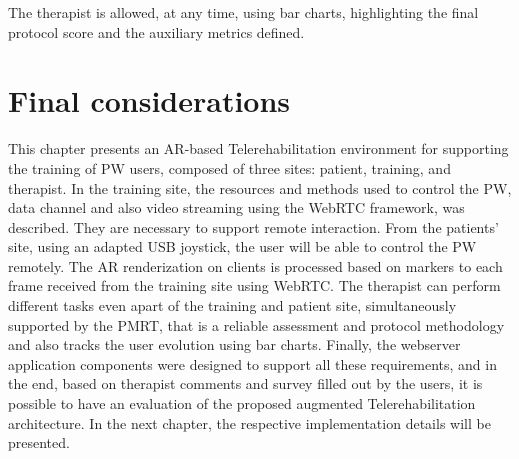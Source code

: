The therapist is allowed, at any time, using bar charts, highlighting the final protocol score and the auxiliary metrics defined. 


\section{Final considerations}

This chapter presents an AR-based Telerehabilitation environment for supporting the training of PW users, composed of three sites: patient, training, and therapist. In the training site, the resources and methods used to control the PW,  data channel and also video streaming using the WebRTC framework, was described. They are necessary to support remote interaction. From the patients' site, using an adapted USB joystick, the user will be able to control the PW remotely. The AR renderization on clients is processed based on markers to each frame received from the training site using WebRTC. The therapist can perform different tasks even apart of the training and patient site, simultaneously supported by the PMRT, that is a reliable assessment and protocol methodology and also tracks the user evolution using bar charts. Finally, the webserver application components were designed to support all these requirements, and in the end, based on therapist comments and survey filled out by the users, it is possible to have an evaluation of the proposed augmented Telerehabilitation architecture. In the next chapter, the respective implementation details will be presented.

